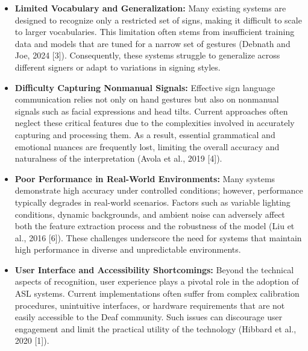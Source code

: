 \documentclass[12pt]{article}
\begin{document}
\begin{itemize}
    \item \textbf{Limited Vocabulary and Generalization:}  
    Many existing systems are designed to recognize only a restricted set of signs, 
    making it difficult to scale to larger vocabularies. This limitation often stems 
    from insufficient training data and models that are tuned for a narrow set of gestures 
    (Debnath and Joe, 2024 [3]). Consequently, these systems struggle to generalize across 
    different signers or adapt to variations in signing styles.

    \item \textbf{Difficulty Capturing Nonmanual Signals:}  
    Effective sign language communication relies not only on hand gestures but also on 
    nonmanual signals such as facial expressions and head tilts. Current approaches often 
    neglect these critical features due to the complexities involved in accurately capturing 
    and processing them. As a result, essential grammatical and emotional nuances are frequently 
    lost, limiting the overall accuracy and naturalness of the interpretation 
    (Avola et al., 2019 [4]).

    \item \textbf{Poor Performance in Real-World Environments:}  
    Many systems demonstrate high accuracy under controlled conditions; however, 
    performance typically degrades in real-world scenarios. Factors such as variable lighting 
    conditions, dynamic backgrounds, and ambient noise can adversely affect both the feature
    extraction process and the robustness of the model (Liu et al., 2016 [6]). These challenges 
    underscore the need for systems that maintain high performance in diverse and unpredictable 
    environments.

    \item \textbf{User Interface and Accessibility Shortcomings:}  
    Beyond the technical aspects of recognition, user experience plays a pivotal role in 
    the adoption of ASL systems. Current implementations often suffer from complex calibration 
    procedures, unintuitive interfaces, or hardware requirements that are not easily accessible 
    to the Deaf community. Such issues can discourage user engagement and limit the practical 
    utility of the technology (Hibbard et al., 2020 [1]).
\end{itemize}

\end{document}
